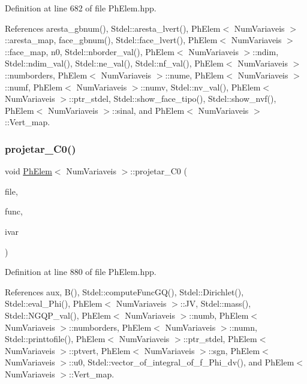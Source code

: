 Definition at line 682 of file Ph\+Elem.\+hpp.



References aresta\+\_\+gbnum(), Stdel\+::aresta\+\_\+lvert(), Ph\+Elem$<$ Num\+Variaveis $>$\+::aresta\+\_\+map, face\+\_\+gbnum(), Stdel\+::face\+\_\+lvert(), Ph\+Elem$<$ Num\+Variaveis $>$\+::face\+\_\+map, n0, Stdel\+::nborder\+\_\+val(), Ph\+Elem$<$ Num\+Variaveis $>$\+::ndim, Stdel\+::ndim\+\_\+val(), Stdel\+::ne\+\_\+val(), Stdel\+::nf\+\_\+val(), Ph\+Elem$<$ Num\+Variaveis $>$\+::numborders, Ph\+Elem$<$ Num\+Variaveis $>$\+::nume, Ph\+Elem$<$ Num\+Variaveis $>$\+::numf, Ph\+Elem$<$ Num\+Variaveis $>$\+::numv, Stdel\+::nv\+\_\+val(), Ph\+Elem$<$ Num\+Variaveis $>$\+::ptr\+\_\+stdel, Stdel\+::show\+\_\+face\+\_\+tipo(), Stdel\+::show\+\_\+nvf(), Ph\+Elem$<$ Num\+Variaveis $>$\+::sinal, and Ph\+Elem$<$ Num\+Variaveis $>$\+::\+Vert\+\_\+map.

\mbox{\label{classPhElem_aa5f168531640b2fb9ac82f85e5f8b11a}} 
\subsubsection{\texorpdfstring{projetar\+\_\+\+C0()}{projetar\_C0()}}
{\footnotesize\ttfamily void \hyperlink{classPhElem}{Ph\+Elem}$<$ Num\+Variaveis $>$\+::projetar\+\_\+\+C0 (\begin{DoxyParamCaption}\item[{F\+I\+LE $\ast$}]{file,  }\item[{double($\ast$)(double, double, double)}]{func,  }\item[{const int \&}]{ivar }\end{DoxyParamCaption})\hspace{0.3cm}{\ttfamily [inherited]}}



Definition at line 880 of file Ph\+Elem.\+hpp.



References aux, B(), Stdel\+::compute\+Func\+G\+Q(), Stdel\+::\+Dirichlet(), Stdel\+::eval\+\_\+\+Phi(), Ph\+Elem$<$ Num\+Variaveis $>$\+::\+JV, Stdel\+::mass(), Stdel\+::\+N\+G\+Q\+P\+\_\+val(), Ph\+Elem$<$ Num\+Variaveis $>$\+::numb, Ph\+Elem$<$ Num\+Variaveis $>$\+::numborders, Ph\+Elem$<$ Num\+Variaveis $>$\+::numn, Stdel\+::printtofile(), Ph\+Elem$<$ Num\+Variaveis $>$\+::ptr\+\_\+stdel, Ph\+Elem$<$ Num\+Variaveis $>$\+::ptvert, Ph\+Elem$<$ Num\+Variaveis $>$\+::sgn, Ph\+Elem$<$ Num\+Variaveis $>$\+::u0, Stdel\+::vector\+\_\+of\+\_\+integral\+\_\+of\+\_\+f\+\_\+\+Phi\+\_\+dv(), and Ph\+Elem$<$ Num\+Variaveis $>$\+::\+Vert\+\_\+map.

